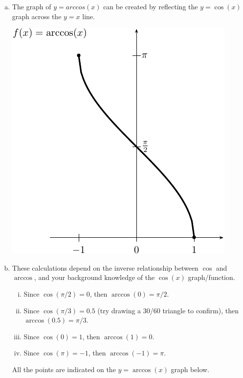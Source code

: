 \begin{enumerate}[1.]
\begin{multicols}{2}
\begin{Solution}
  \begin{enumerate}[(a)]
  \item The graph of $y = arccos(x)$ can be created by reflecting
the $y = \cos(x)$ graph across the $y = x$ line. 
\begin{center}
\includegraphics[width=0.8\linewidth]{graphics/Week01_InverseTrig/arccos}
\end{center}
\item These calculations depend on the inverse relationship between
  $\cos$ and $\arccos$, and your background knowledge of the $\cos(x)$
  graph/function.
\begin{enumerate}[(i)]
\item Since $\cos(\pi/2) = 0$, then $\arccos(0) = \pi/2$. 
\item Since $\cos(\pi/3) = 0.5$ (try drawing a 30/60 triangle to
  confirm), then $\arccos(0.5) = \pi/3$.
\item Since $\cos(0) = 1$, then $\arccos(1) = 0$.
\item Since $\cos(\pi) = -1$, then $\arccos(-1) = \pi$.
\end{enumerate}
All the points are indicated on the $y = \arccos(x)$ graph below.
\begin{center}

\end{center}
\end{enumerate}
\end{Solution}
\end{multicols}
\end{enumerate}
